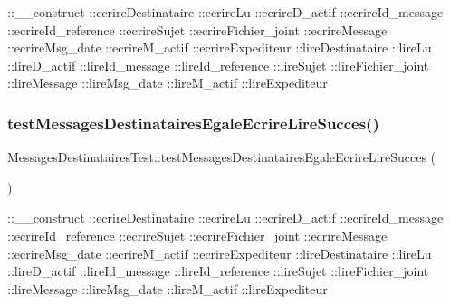 \+::\+\_\+\+\_\+construct  \+::ecrire\+Destinataire  \+::ecrire\+Lu  \+::ecrire\+D\+\_\+actif  \+::ecrire\+Id\+\_\+message  \+::ecrire\+Id\+\_\+reference  \+::ecrire\+Sujet  \+::ecrire\+Fichier\+\_\+joint  \+::ecrire\+Message  \+::ecrire\+Msg\+\_\+date  \+::ecrire\+M\+\_\+actif  \+::ecrire\+Expediteur  \+::lire\+Destinataire  \+::lire\+Lu  \+::lire\+D\+\_\+actif  \+::lire\+Id\+\_\+message  \+::lire\+Id\+\_\+reference  \+::lire\+Sujet  \+::lire\+Fichier\+\_\+joint  \+::lire\+Message  \+::lire\+Msg\+\_\+date  \+::lire\+M\+\_\+actif  \+::lire\+Expediteur \mbox{\label{class_messages_destinataires_test_ae1e2fa4ac568e7aeffe3e158dca49bac}} 
\subsubsection{\texorpdfstring{test\+Messages\+Destinataires\+Egale\+Ecrire\+Lire\+Succes()}{testMessagesDestinatairesEgaleEcrireLireSucces()}\hspace{0.1cm}{\footnotesize\ttfamily [2/2]}}
{\footnotesize\ttfamily Messages\+Destinataires\+Test\+::test\+Messages\+Destinataires\+Egale\+Ecrire\+Lire\+Succes (\begin{DoxyParamCaption}{ }\end{DoxyParamCaption})}

\+::\+\_\+\+\_\+construct  \+::ecrire\+Destinataire  \+::ecrire\+Lu  \+::ecrire\+D\+\_\+actif  \+::ecrire\+Id\+\_\+message  \+::ecrire\+Id\+\_\+reference  \+::ecrire\+Sujet  \+::ecrire\+Fichier\+\_\+joint  \+::ecrire\+Message  \+::ecrire\+Msg\+\_\+date  \+::ecrire\+M\+\_\+actif  \+::ecrire\+Expediteur  \+::lire\+Destinataire  \+::lire\+Lu  \+::lire\+D\+\_\+actif  \+::lire\+Id\+\_\+message  \+::lire\+Id\+\_\+reference  \+::lire\+Sujet  \+::lire\+Fichier\+\_\+joint  \+::lire\+Message  \+::lire\+Msg\+\_\+date  \+::lire\+M\+\_\+actif  \+::lire\+Expediteur \mbox{\label{class_messages_destinataires_test_a176c681d7d5638b906154d55ac7effa2}} 
